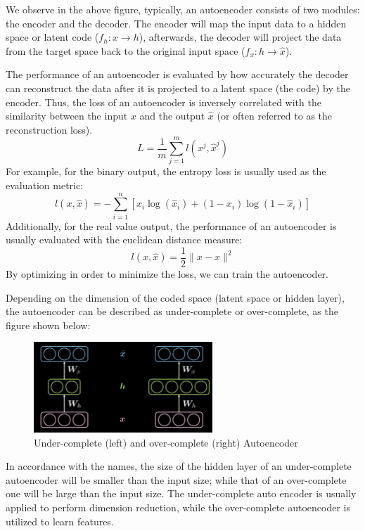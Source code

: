 We observe in the above figure, typically, an autoencoder consists of two modules: the encoder and the decoder. The encoder will map the input data to a hidden space or latent code ($f_h: x\rightarrow h$), afterwards, the decoder will project the data from the target space back to the original input space ($f_x: h\rightarrow \hat{x}$).

The performance of an autoencoder is evaluated by how accurately the decoder can reconstruct the data after it is projected to a latent space (the code) by the encoder. Thus, the loss of an autoencoder is inversely correlated with the similarity between the input $x$ and the output $\hat{x}$ (or often referred to as the reconstruction loss). 
$$ L=\frac{1}{m}\sum_{j=1}^m l(x^j,\hat{x}^j) $$
For example, for the binary output, the entropy loss is usually used as the evaluation metric:
$$ l(x,\hat{x}) = -\sum_{i=1}^n[x_i\log(\hat{x}_i) + (1-x_i)\log(1-\hat{x}_i) ]$$
Additionally, for the real value output, the performance of an autoencoder is usually evaluated with the euclidean distance measure:
$$ l(x,\hat{x}) = \frac{1}{2} \| x-\hat{x} \|^2 $$
By optimizing in order to minimize the loss, we can train the autoencoder.

Depending on the dimension of the coded space (latent space or hidden layer), the autoencoder can be described as under-complete or over-complete, as the figure shown below:

\begin{figure}[htb]
    \centering
    \includegraphics[width=0.6\textwidth]{figs/Under_(over)_complete_Autoencoder.png}
    \caption{Under-complete (left) and over-complete (right) Autoencoder}
    \label{fig:Under_(over)_complete_Autoencoder}
\end{figure}

In accordance with the names, the size of the hidden layer of an under-complete autoencoder will be smaller than the input size; while that of an over-complete one will be large than the input size. The under-complete auto encoder is usually applied to perform dimension reduction, while the over-complete autoencoder is utilized to learn features.

